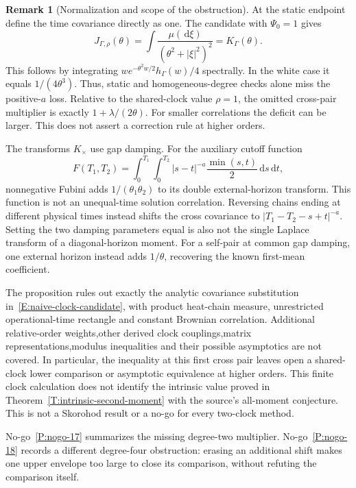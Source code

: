 \documentclass[12pt,oneside,openany]{book}
\numberwithin{equation}{section}
\theoremstyle{nogostyle}
\theoremstyle{definition}
\newtheorem{remark}[theorem]{Remark}
\newcommand{\ud}{\,\mathrm{d}}
\begin{document}
\begin{remark}[Normalization and scope of the obstruction]
  \label{R:clock-copy-scope}
  At the static endpoint define the time covariance directly as one. The
  candidate with \(\Psi_0=1\) gives
  \[
    J_{\Gamma,\rho}(\theta)
    =\int\frac{\mu(\ud\xi)}{(\theta^2+|\xi|^2)^2}
    =K_\Gamma(\theta).
  \]
  This follows by integrating \(w e^{-\theta^2w/2}h_\Gamma(w)/4\) spectrally. In
  the white case it equals \(1/(4\theta^3)\). Thus, static and
  homogeneous-degree checks alone miss the positive-\(a\) loss. Relative to the
  shared-clock value \(\rho=1\), the omitted cross-pair multiplier is exactly
  \(1+\lambda/(2\theta)\). For smaller correlations the deficit can be larger.
  This does not assert a correction rule at higher orders.

  The transforms \(K_\times\) use gap damping. For the auxiliary cutoff function
  \[
    F(T_1,T_2)=\int_0^{T_1}\int_0^{T_2}
    |s-t|^{-a}\frac{\min(s,t)}2\ud s\ud t,
  \]
  nonnegative Fubini adds \(1/(\theta_1\theta_2)\) to its double
  external-horizon transform. This function is not an unequal-time solution
  correlation. Reversing chains ending at different physical times instead
  shifts the cross covariance to \(|T_1-T_2-s+t|^{-a}\). Setting the two damping
  parameters equal is also not the single Laplace transform of a
  diagonal-horizon moment. For a self-pair at common gap damping, one external
  horizon instead adds \(1/\theta\), recovering the known first-mean
  coefficient.

  The proposition rules out exactly the analytic covariance substitution
  in~\eqref{E:naive-clock-candidate}, with product heat-chain measure,
  unrestricted operational-time rectangle and constant Brownian correlation.
  Additional relative-order weights,other derived clock couplings,matrix
  representations,modulus inequalities and their possible asymptotics are not
  covered. In particular, the inequality at this first cross pair leaves open a
  shared-clock lower comparison or asymptotic equivalence at higher orders. This
  finite clock calculation does not identify the intrinsic value proved  in
  Theorem~\ref{T:intrinsic-second-moment} with the source's all-moment
  conjecture. This is not a Skorohod result or a no-go for every two-clock
  method.
\end{remark}

No-go~\ref{P:nogo-17} summarizes the missing degree-two multiplier.
No-go~\ref{P:nogo-18} records a different degree-four obstruction: erasing
an additional shift makes one upper envelope too large to close its
comparison, without refuting the comparison itself.
\end{document}
